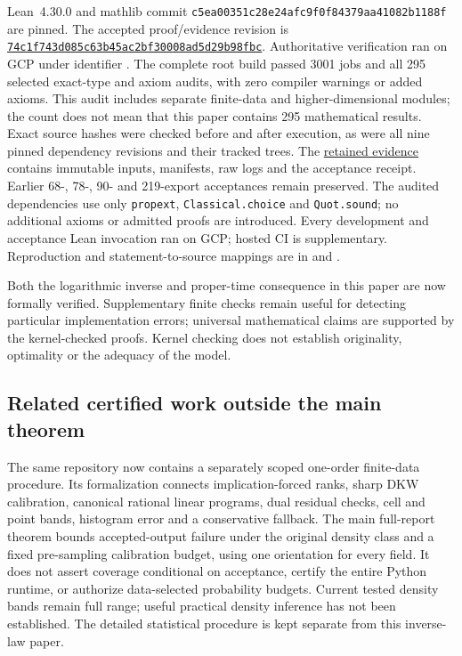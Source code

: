 \documentclass[11pt]{article}
\theoremstyle{remark}
\begin{document}
Lean~4.30.0 and mathlib commit
\texttt{c5ea00351c28e24afc9f0f84379aa41082b1188f} are pinned.
The accepted proof/evidence revision is
\href{https://github.com/Quantyra/quantyra-null-cone-lean/tree/74c1f743d085c63b45ac2bf30008ad5d29b98fbc}{\texttt{74c1f743d085c63b45ac2bf30008ad5d29b98fbc}}.
Authoritative verification ran on GCP under identifier
.
The complete root build passed 3001 jobs and all 295 selected exact-type
and axiom audits, with zero compiler warnings or added axioms.
This audit includes separate finite-data and higher-dimensional modules;
the count does not mean that this paper contains 295 mathematical results.
Exact source hashes were checked before and after execution, as were
all nine pinned dependency revisions and their tracked trees.
The \href{https://github.com/Quantyra/quantyra-null-cone-lean/tree/74c1f743d085c63b45ac2bf30008ad5d29b98fbc/evidence/gcp/space-lorentz-acceptance-20261008T071627Z-221cd8}{retained evidence}
contains immutable inputs, manifests, raw logs and the acceptance receipt.
Earlier 68-, 78-, 90- and 219-export acceptances remain preserved.
The audited dependencies use only \texttt{propext},
\texttt{Classical.choice} and \texttt{Quot.sound}; no additional axioms
or admitted proofs are introduced. Every development and acceptance
Lean invocation ran on GCP; hosted CI is supplementary.
Reproduction and statement-to-source mappings are in
 and .

Both the logarithmic inverse and proper-time consequence in this paper
are now formally verified. Supplementary finite checks remain useful
for detecting particular implementation errors; universal mathematical
claims are supported by the kernel-checked proofs. Kernel checking does
not establish originality, optimality or the adequacy of the model.

\subsection{Related certified work outside the main theorem}
The same repository now contains a separately scoped one-order
finite-data procedure. Its formalization connects implication-forced
ranks, sharp DKW calibration, canonical rational linear programs,
dual residual checks, cell and point bands, histogram error and a
conservative fallback. The main full-report theorem bounds
accepted-output failure under the original density class and a fixed
pre-sampling calibration budget, using one orientation for every field.
It does not assert coverage conditional on acceptance, certify the
entire Python runtime, or authorize data-selected probability budgets.
Current tested density bands remain full range; useful practical
density inference has not been established. The detailed statistical
procedure is kept separate from this inverse-law paper.
\end{document}
